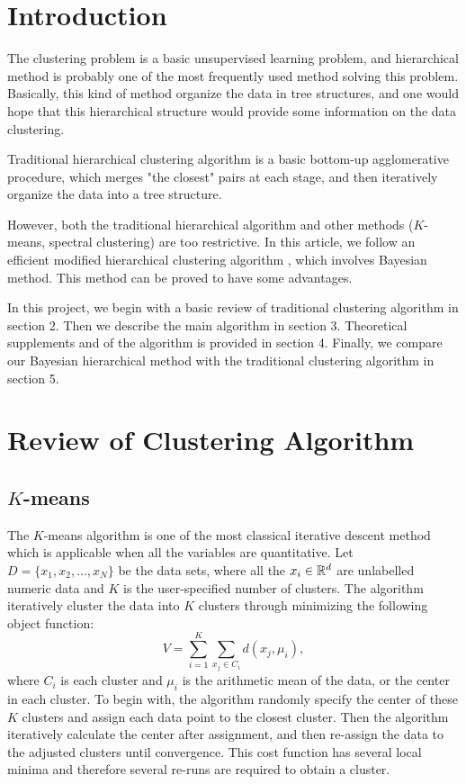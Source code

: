 
\section{Introduction}

The clustering problem is a basic unsupervised learning problem, and hierarchical method is probably one of the most frequently used method solving this problem. Basically, this kind of method organize the data in tree structures, and one would hope that this hierarchical structure would provide some information on the data clustering. 

Traditional hierarchical clustering algorithm \cite{hier2} is a basic bottom-up agglomerative procedure, which merges "the closest" pairs at each stage, and then iteratively organize the data into a tree structure.

However, both the traditional hierarchical algorithm and other methods ($K$-means, spectral clustering) are too restrictive. In this article, we follow an efficient modified hierarchical clustering algorithm \cite{bhc}, which involves Bayesian method. This method can be proved to have some advantages.

In this project, we begin with a basic review of traditional clustering algorithm in section 2. Then we describe the main algorithm in section 3. Theoretical supplements and of the algorithm is provided in section 4. Finally, we compare our Bayesian hierarchical method with the traditional clustering algorithm in section 5.

\section{Review of Clustering Algorithm}

\subsection{$K$-means}

The $K$-means algorithm \cite{kmeans} is one of the most classical iterative descent method which is applicable when all the variables are quantitative. Let $ D = \{ x_1, x_2, \dots, x_N \} $ be the data sets, where all the $x_i\in \mathbb{R}^d$ are unlabelled numeric data and $K$ is the user-specified number of clusters. The algorithm iteratively cluster the data into $K$ clusters through minimizing the following object function:
\begin{equation*}
     V=\sum_{i=1}^{K} \sum_{x_j \in C_i} d(x_j, \mu_i),
\end{equation*}
where $C_i$ is each cluster and $\mu_i$ is the arithmetic mean of the data, or the center in each cluster. To begin with, the algorithm randomly specify the center of these $K$ clusters and assign each data point to the closest cluster. Then the algorithm iteratively calculate the center after assignment, and then re-assign the data to the adjusted clusters until convergence. This cost function has several local minima and therefore several re-runs are required to obtain a cluster. 

